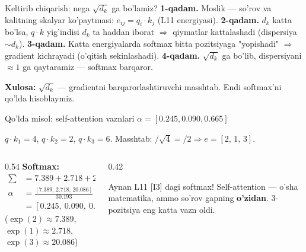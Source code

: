 \documentclass[aspectratio=169,11pt]{beamer}
\begin{document}
\begin{frame}{Keltirib chiqarish: nega $\sqrt{d_k}$ ga bo'lamiz?}
  \textbf{1-qadam.} Moslik --- so'rov va kalitning skalyar ko'paytmasi:
  $e_{ij}=q_i \cdot k_j$ (L11 energiyasi).
  \pause
  \textbf{2-qadam.} $d_k$ katta bo'lsa, $q\cdot k$ yig'indisi $d_k$ ta haddan
  iborat $\Rightarrow$ qiymatlar kattalashadi (dispersiya $\sim d_k$).
  \pause
  \textbf{3-qadam.} Katta energiyalarda softmax bitta pozitsiyaga "yopishadi"
  $\Rightarrow$ gradient kichrayadi (o'qitish sekinlashadi).
  \pause
  \textbf{4-qadam.} $\sqrt{d_k}$ ga bo'lib, dispersiyani $\approx 1$ ga
  qaytaramiz --- softmax barqaror.
  \begin{tcolorbox}[okbox,top=2pt,bottom=2pt]
    \small \textbf{Xulosa:} $\sqrt{d_k}$ --- gradientni barqarorlashtiruvchi
    masshtab. Endi softmax'ni qo'lda hisoblaymiz.
  \end{tcolorbox}
\end{frame}

\begin{frame}{Qo'lda misol: self-attention vaznlari $\alpha=[0.245, 0.090, 0.665]$}
  \begin{tcolorbox}[defbox,title={So'rov $\cdot$ kalit ko'paytmalari ($d_k=4$)}]
    \small $q\cdot k_1 = 4$, \; $q\cdot k_2 = 2$, \; $q\cdot k_3 = 6$. \quad
    Masshtab: $/\sqrt{4}=/2 \Rightarrow e=[2,\,1,\,3]$.
  \end{tcolorbox}
  \vspace{0.2em}
  \begin{columns}[T]
    \begin{column}{0.54\textwidth}
      \textbf{Softmax:}
      \begin{align*}
        \textstyle\sum &= 7.389 + 2.718 + 20.086 = 30.193\\
        \alpha &= \tfrac{[7.389,\, 2.718,\, 20.086]}{30.193}\\
          &= \mathbf{[0.245,\ 0.090,\ 0.665]}
      \end{align*}
      \footnotesize ($\exp(2){\approx}7.389$, $\exp(1){\approx}2.718$, $\exp(3){\approx}20.086$)
    \end{column}
    \begin{column}{0.42\textwidth}
      \begin{tcolorbox}[okbox,top=2pt,bottom=2pt]
        \footnotesize
        Aynan L11 [I3] dagi softmax! Self-attention --- o'sha matematika, ammo
        so'rov gapning \textbf{o'zidan}. 3-pozitsiya eng katta vazn oldi.
      \end{tcolorbox}
    \end{column}
  \end{columns}
\end{frame}
\end{document}
